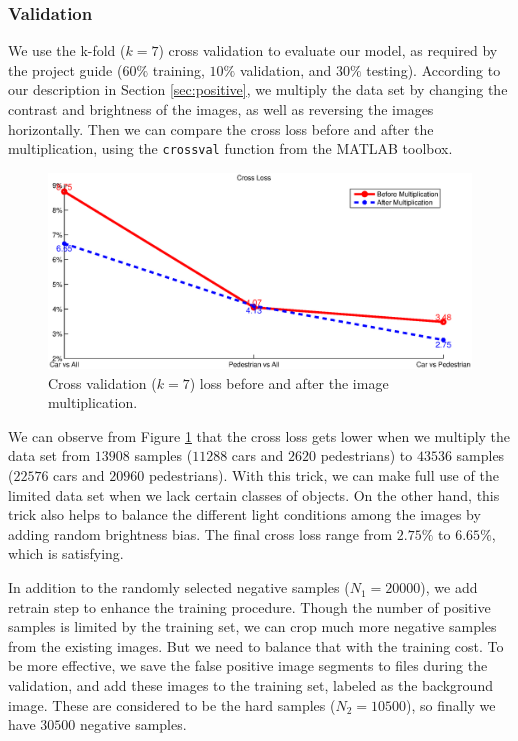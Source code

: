 \documentclass{article} %
\begin{document}
\subsubsection{Validation}

We use the k-fold ($k=7$) cross validation to evaluate our model, as required by the project guide ($60\%$ training, $10\%$ validation, and $30\%$ testing). According to our description in Section \ref{sec:positive}, we multiply the data set by changing the contrast and brightness of the images, as well as reversing the images horizontally. Then we can compare the cross loss before and after the multiplication, using the \texttt{crossval} function from the MATLAB toolbox.


\begin{figure}[htb]
\begin{center}
\includegraphics[width=\textwidth]{crossloss.eps}
\end{center}
\caption{Cross validation ($k=7$) loss before and after the image multiplication.
\label{fig:crossloss}}
\end{figure}


We can observe from Figure \ref{fig:crossloss} that the cross loss gets lower when we multiply the data set from $13908$ samples ($11288$ cars and $2620$ pedestrians) to $43536$ samples ($22576$ cars and $20960$ pedestrians). With this trick, we can make full use of the limited data set when we lack certain classes of objects. On the other hand, this trick also helps to balance the different light conditions among the images by adding random brightness bias. The final cross loss range from $2.75\%$ to $6.65\%$, which is satisfying. 

In addition to the randomly selected negative samples ($N_1=20000$), we add retrain step to enhance the training procedure. Though the number of positive samples is limited by the training set, we can crop much more negative samples from the existing images. But we need to balance that with the training cost. To be more effective, we save the false positive image segments to files during the validation, and add these images to the training set, labeled as the background image. These are considered to be the hard samples ($N_2=10500$), so finally we have $30500$ negative samples.
\end{document}
